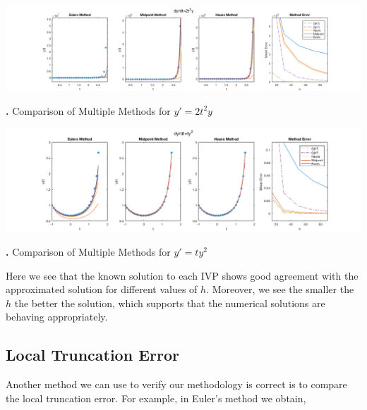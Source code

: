 \documentclass[11.5pt]{article}
\newcounter{graphics}
\begin{document}
\begin{center}
\includegraphics[width = 6.5in]{2nd.png}\\
\begin{scriptsize}
{\bf {}.} Comparison of Multiple Methods for $y' = 2t^2y$
\end{scriptsize}
\end{center}
%

\begin{center}
\includegraphics[width = 6.5in]{4th.png}\\
\begin{scriptsize}
{\bf {}.} Comparison of Multiple Methods for $y' = ty^2$
\end{scriptsize}
\end{center}

Here we see that the known solution to each IVP shows good agreement with the approximated solution for different values of $h$. Moreover, we see the smaller the $h$ the better the solution, which supports that the numerical solutions are behaving appropriately. 

\subsection*{Local Truncation Error}
Another method we can use to verify our methodology is correct is to compare the local truncation error. For example, in Euler's method we obtain,
\end{document}
